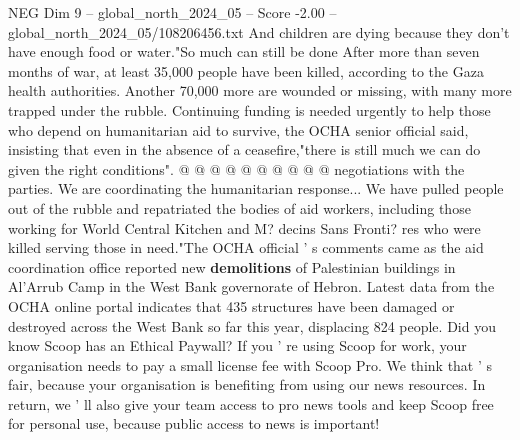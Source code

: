 \begin{textsample}{NEG Dim 9 – global\_north\_2024\_05 – Score -2.00 – global\_north\_2024\_05/108206456.txt}
And children are dying because they don't have enough food or water."So much can still be done After more than seven months of war, at least 35,000 people have been killed, according to the Gaza health authorities.
Another 70,000 more are wounded or missing, with many more trapped under the rubble.
Continuing funding is needed urgently to help those who depend on humanitarian aid to survive, the OCHA senior official said, insisting that even in the absence of a ceasefire,"there is still much we can do given the right conditions". @ @ @ @ @ @ @ @ @ @ negotiations with the parties.
We are coordinating the humanitarian response...
We have pulled people out of the rubble and repatriated the bodies of aid workers, including those working for World Central Kitchen and M? decins Sans Fronti? res who were killed serving those in need."The OCHA official ' s comments came as the aid coordination office reported new \textbf{demolitions} of Palestinian buildings in Al'Arrub Camp in the West Bank governorate of Hebron.
Latest data from the OCHA online portal indicates that 435 structures have been damaged or destroyed across the West Bank so far this year, displacing 824 people.
Did you know Scoop has an Ethical Paywall?
If you ' re using Scoop for work, your organisation needs to pay a small license fee with Scoop Pro.
We think that ' s fair, because your organisation is benefiting from using our news resources.
In return, we ' ll also give your team access to pro news tools and keep Scoop free for personal use, because public access to news is important!

\end{textsample}
